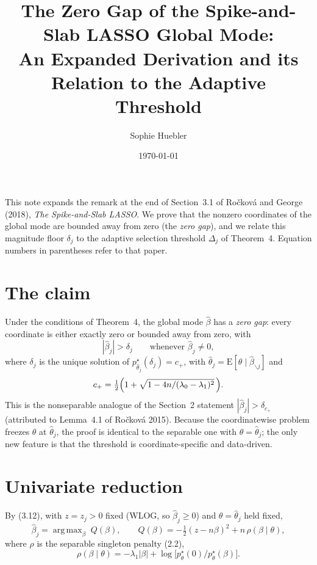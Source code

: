 \documentclass[11pt]{article}
\title{The Zero Gap of the Spike-and-Slab LASSO Global Mode:\\
An Expanded Derivation and its Relation to the Adaptive Threshold}
\author{Sophie Huebler}
\date{\today}
\newcommand{\bhat}{\widehat{\beta}}
\newcommand{\pstar}{p^{\star}}
\newcommand{\thetahat}{\widehat{\theta}}
\newcommand{\Estar}{\mathrm{E}}
\newcommand{\lamdiff}{(\lambda_0-\lambda_1)}
\newcommand{\betasub}{\bhat_{\backslash j}}
\DeclareMathOperator*{\argmax}{arg\,max}
\begin{document}
\maketitle

\noindent
This note expands the remark at the end of Section~3.1 of Ro\v{c}kov\'a and
George (2018), \emph{The Spike-and-Slab LASSO}. We prove that the nonzero
coordinates of the global mode are bounded away from zero (the \emph{zero
gap}), and we relate this magnitude floor $\delta_j$ to the adaptive selection
threshold $\Delta_j$ of Theorem~4. Equation numbers in parentheses refer to
that paper.

\section{The claim}

Under the conditions of Theorem~4, the global mode $\bhat$ has a \emph{zero
gap}: every coordinate is either exactly zero or bounded away from zero, with
\begin{equation}\label{eq:claim}
  |\bhat_j| > \delta_j
  \qquad\text{whenever } \bhat_j \neq 0,
\end{equation}
where $\delta_j$ is the unique solution of $\pstar_{\thetahat_j}(\delta_j)=c_+$,
with $\thetahat_j = \Estar[\theta \mid \betasub]$ and
\begin{equation}\label{eq:cplus}
  c_+ = \tfrac{1}{2}\Bigl(1 + \sqrt{1 - 4n/\lamdiff^2}\,\Bigr).
\end{equation}
This is the nonseparable analogue of the Section~2 statement
$|\bhat_j| > \delta_{c_+}$ (attributed to Lemma~4.1 of Ro\v{c}kov\'a 2015).
Because the coordinatewise problem freezes $\theta$ at $\thetahat_j$, the proof
is identical to the separable one with $\theta = \thetahat_j$; the only new
feature is that the threshold is coordinate-specific and data-driven.

\section{Univariate reduction}

By (3.12), with $z=z_j>0$ fixed (WLOG, so $\bhat_j\ge 0$) and
$\theta=\thetahat_j$ held fixed,
\begin{equation}\label{eq:uniobj}
  \bhat_j = \argmax_{\beta}\; Q(\beta),
  \qquad
  Q(\beta) = -\tfrac{1}{2}(z-n\beta)^2 + n\,\rho(\beta\mid\theta),
\end{equation}
where $\rho$ is the separable singleton penalty (2.2),
\begin{equation}\label{eq:rho}
  \rho(\beta\mid\theta)
    = -\lambda_1|\beta| + \log\!\bigl[\pstar_\theta(0)/\pstar_\theta(\beta)\bigr].
\end{equation}
\end{document}
